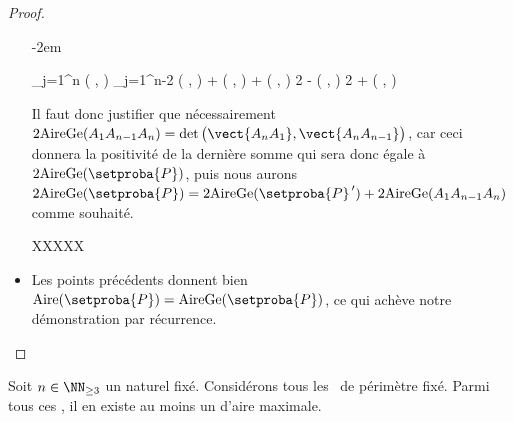 \begin{proof}
\begin{itemize}
		\leavevmode\kern-2em%
		\begin{stepcalc}[style=ar*]
			 
			\dsum_{j=1}^{n} \det \big(  ,   \big)
		\explnext{}
			\dsum_{j=1}^{n-2} \det \big(  ,  \big)
			+
			\det \big(  ,   \big)
			+
			\det \big(  ,   \big)
		          {}
			2 
			-
			\det \big(  ,  \big)
		\explnext{}
			2 
			+
			\det \big(  ,  \big)
		\end{stepcalc}
		
		\noindent
		Il faut donc justifier que nécessairement 
		$2 \garea{A_1 A_{n-1} A_n} = \det \big( \vect{A_n A_1} , \vect{A_n A_{n-1}} \big)$,
		car ceci donnera la positivité de la dernière somme qui sera donc égale à $2 \garea{\setproba{P}}$, puis nous aurons 
		$2 \garea{\setproba{P}} = 2 \garea{\setproba{P}^{\,\prime}} + 2 \garea{A_1 A_{n-1} A_n}$ 
		comme souhaité.
		
		
		
		XXXXX


    	\item Les points précédents donnent bien $\area{\setproba{P}} = \garea{\setproba{P}}$, ce qui achève notre démonstration par récurrence.
    \end{itemize}
\end{proof}




\begin{fact} \label{suff-cond}
    Soit $n \in \NN_{\geq3}$ un naturel fixé.
    Considérons tous les \ngones\ de périmètre fixé. Parmi tous ces \ngones, il en existe au moins un d'aire maximale.
\end{fact}



